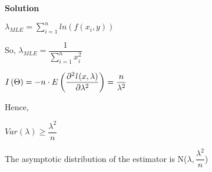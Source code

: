 \documentclass[12pt]{article}
\begin{document}
\medskip

\textbf{Solution}

\begin{list}{()~}{}
\item
$\lambda_{MLE} = \sum^{n}_{i=1}ln(f(x_i,y))$

So, $\lambda_{MLE} = \dfrac{1}{\sum^{n}_{i=1} x^{2}_i}$

\item $I\left(\Theta\right)=-n\cdot E\left(\dfrac{\partial^2 \emph{l}\left(x, \lambda\right)}{\partial\lambda^2}\right)=\dfrac{n}{\lambda^2}$

Hence,

$Var\left(\lambda\right) \geq \dfrac{\lambda^2}{n}$
\item
The asymptotic distribution of the estimator is N($\lambda, \dfrac{\lambda^2}{n}$)
\end{list}
\end{document}
